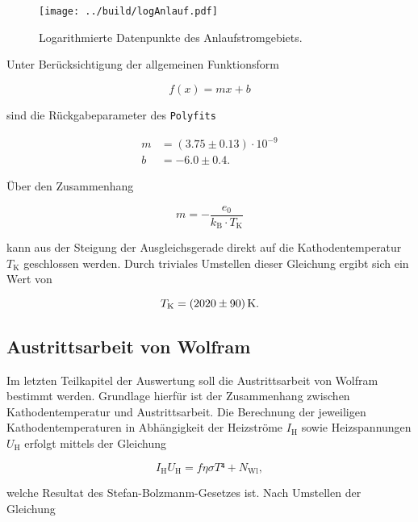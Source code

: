 \begin{figure}[H]
    \centering 
    \texttt{[image: ../build/logAnlauf.pdf]}
    \caption{Logarithmierte Datenpunkte des Anlaufstromgebiets.}
    \label{fig:Anlaufstromgebiet}
\end{figure}

\noindent Unter Berücksichtigung der allgemeinen Funktionsform 

\begin{equation*}
    f(x) = mx + b 
\end{equation*}

\noindent sind die Rückgabeparameter des \texttt{Polyfits}

\begin{align*}
    m &= \left(3.75\pm{}0.13\right)\cdot{}10^{-9}\\
    b &= -6.0\pm{}0.4.
\end{align*}

\noindent Über den Zusammenhang 

\begin{equation*}
    m = -\frac{e_0}{k_\text{B}\cdot{}T_\text{K}}
\end{equation*}

\noindent kann aus der Steigung der Ausgleichsgerade direkt auf die Kathodentemperatur $T_\text{K}$ geschlossen werden. Durch triviales Umstellen 
dieser Gleichung ergibt sich ein Wert von 

\begin{equation*}
    T_\text{K} = \qty{2020\pm90}{\kelvin}.
\end{equation*}

\subsection{Austrittsarbeit von Wolfram}
\label{sec:Austrittsarbeit}

Im letzten Teilkapitel der Auswertung soll die Austrittsarbeit von Wolfram bestimmt werden. Grundlage hierfür ist der Zusammenhang zwischen Kathodentemperatur
und Austrittsarbeit. Die Berechnung der jeweiligen Kathodentemperaturen in Abhängigkeit der Heizströme $I_\text{H}$ sowie Heizspannungen $U_\text{H}$ erfolgt 
mittels der Gleichung 

\begin{equation*}
    I_\text{H}U_\text{H} = f\eta\sigma{}T⁴ + N_\text{Wl},
\end{equation*}

\noindent welche Resultat des Stefan-Bolzmanm-Gesetzes ist. Nach Umstellen der Gleichung 

